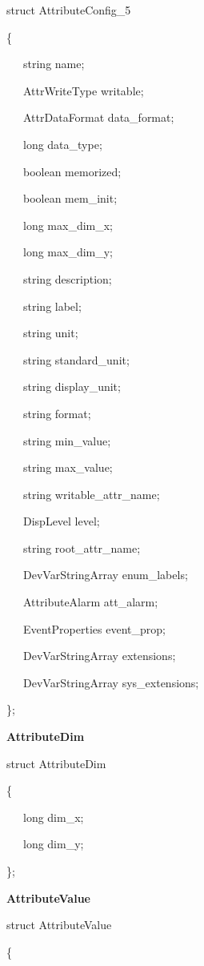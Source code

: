 struct AttributeConfig\_5

\{

~~~string name;

~~~AttrWriteType writable;

~~~AttrDataFormat data\_format;

~~~long data\_type;

~~~boolean memorized;

~~~boolean mem\_init;

~~~long max\_dim\_x;

~~~long max\_dim\_y;

~~~string description;

~~~string label;

~~~string unit;

~~~string standard\_unit;

~~~string display\_unit;

~~~string format;

~~~string min\_value;

~~~string max\_value;

~~~string writable\_attr\_name;

~~~DispLevel level;

~~~string root\_attr\_name;

~~~DevVarStringArray enum\_labels;

~~~AttributeAlarm att\_alarm;

~~~EventProperties event\_prop;

~~~DevVarStringArray extensions;

~~~DevVarStringArray sys\_extensions;

\};\\


\begin{flushleft}
\textbf{AttributeDim}
\par\end{flushleft}

struct AttributeDim

\{

~~~long dim\_x;

~~~long dim\_y;

\};\\


\begin{flushleft}
\textbf{AttributeValue}
\par\end{flushleft}

struct AttributeValue

\{

